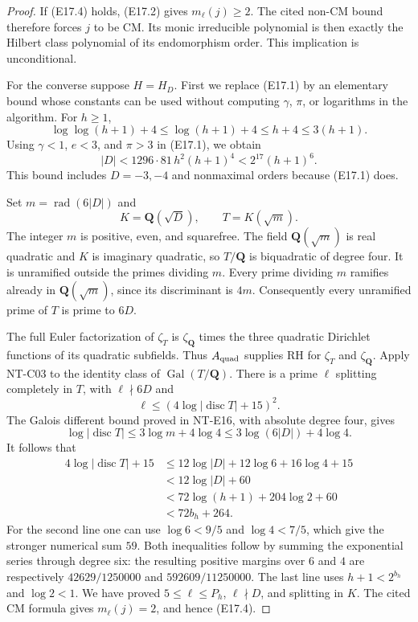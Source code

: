 \begin{proof}
If (E17.4) holds, (E17.2) gives $m_\ell(j)\ge2$.
The cited non-CM bound therefore forces $j$ to be CM.
Its monic irreducible polynomial is then exactly
the Hilbert class polynomial of its endomorphism
order. This implication is unconditional.

For the converse suppose $H=H_D$.
First we replace (E17.1) by an elementary bound
whose constants can be used without computing
$\gamma$, $\pi$, or logarithms in the algorithm.
For $h\ge1$,
\[
 \log\log(h+1)+4
 \le\log(h+1)+4
 \le h+4\le3(h+1).
\]
Using $\gamma<1$, $e<3$, and $\pi>3$ in (E17.1),
we obtain
\[
 |D|<1296\cdot81\,h^2(h+1)^4
       <2^{17}(h+1)^6.
 \tag{E17.5}
\]
This bound includes $D=-3,-4$ and nonmaximal orders
because (E17.1) does.

Set $m=\operatorname{rad}(6|D|)$ and
\[
 K=\mathbf Q(\sqrt D),\qquad
 T=K(\sqrt m).
\]
The integer $m$ is positive, even, and squarefree.
The field $\mathbf Q(\sqrt m)$ is real quadratic
and $K$ is imaginary quadratic, so $T/\mathbf Q$
is biquadratic of degree four.
It is unramified outside the primes dividing $m$.
Every prime dividing $m$ ramifies already in
$\mathbf Q(\sqrt m)$, since its discriminant is $4m$.
Consequently every unramified prime of $T$ is
prime to $6D$.

The full Euler factorization of $\zeta_T$ is
$\zeta_{\mathbf Q}$ times the three quadratic
Dirichlet functions of its quadratic subfields.
Thus $A_{\rm quad}$ supplies RH for $\zeta_T$
and $\zeta_{\mathbf Q}$.
Apply NT-C03 to the identity class of
$\operatorname{Gal}(T/\mathbf Q)$.
There is a prime $\ell$ splitting completely in $T$,
with $\ell\nmid6D$ and
\[
                 \ell\le(4\log|\operatorname{disc}T|+15)^2.
\]
The Galois different bound proved in NT-E16,
with absolute degree four, gives
\[
 \log|\operatorname{disc}T|
       \le3\log m+4\log4
       \le3\log(6|D|)+4\log4.
 \tag{E17.6}
\]
It follows that
\[
 \begin{aligned}
 4\log|\operatorname{disc}T|+15
   &\le12\log|D|+12\log6+16\log4+15\\
   &<12\log|D|+60\\
   &<72\log(h+1)+204\log2+60\\
   &<72b_h+264.
 \end{aligned}
 \tag{E17.7}
\]
For the second line one can use
$\log6<9/5$ and $\log4<7/5$, which give the
stronger numerical sum $59$.
Both inequalities follow by summing the exponential
series through degree six:
the resulting positive margins over $6$ and $4$
are respectively $42629/1250000$ and
$592609/11250000$.
The last line uses $h+1<2^{b_h}$ and $\log2<1$.
We have proved $5\le\ell\le P_h$, $\ell\nmid D$,
and splitting in $K$.
The cited CM formula gives $m_\ell(j)=2$,
and hence (E17.4).


\end{proof}
